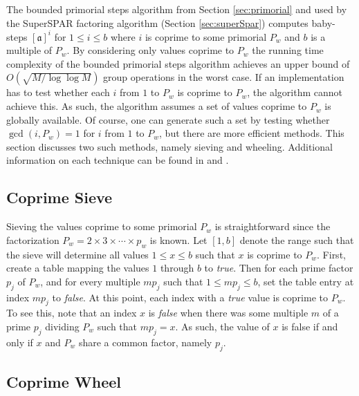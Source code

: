 \documentclass{ucalgthes1}
\theoremstyle{definition}
\newcommand{\ideal}{\mathfrak}
\newcommand{\idealclass}[1]{\left[ \ideal #1 \right]}
\newcommand{\aclass}{\idealclass a}
\begin{document}
The bounded primorial steps algorithm from Section \ref{sec:primorial} and used by the SuperSPAR factoring algorithm (Section \ref{sec:superSpar}) computes baby-steps $\aclass^i$ for $1 \le i \le b$ where $i$ is coprime to some primorial $P_w$ and $b$ is a multiple of $P_w$.  By considering only values coprime to $P_w$ the running time complexity of the bounded primorial steps algorithm achieves an upper bound of $O(\sqrt{M/\log \log M})$ group operations in the worst case.  If an implementation has to test whether each $i$ from $1$ to $P_w$ is coprime to $P_w$, the algorithm cannot achieve this.  As such, the algorithm assumes a set of values coprime to $P_w$ is globally available.  Of course, one can generate such a set by testing whether $\gcd(i, P_w) = 1$ for $i$ from $1$ to $P_w$, but there are more efficient methods.  This section discusses two such methods, namely sieving and wheeling.  Additional information on each technique can be found in \cite[pp.117--127]{Crandall2001} and \cite[p.494]{Sutherland2009}.


\subsection{Coprime Sieve}

Sieving the values coprime to some primorial $P_w$ is straightforward since the factorization $P_w = 2 \times 3 \times \cdots \times p_w$ is known.  Let $[1,b]$ denote the range such that the sieve will determine all values $1 \le x \le b$ such that $x$ is coprime to $P_w$.  First, create a table mapping the values $1$ through $b$ to \emph{true}.  Then for each prime factor $p_j$ of $P_w$, and for every multiple $mp_j$ such that $1 \le mp_j \le b$, set the table entry at index $mp_j$ to \emph{false}.  At this point, each index with a \emph{true} value is coprime to $P_w$.  To see this, note that an index $x$ is \emph{false} when there was some multiple $m$ of a prime $p_j$ dividing $P_w$ such that $mp_j = x$.  As such, the value of $x$ is false if and only if $x$ and $P_w$ share a common factor, namely $p_j$.

\subsection{Coprime Wheel}
\newcommand{\coprimeset}{\mathcal C}
\newcommand{\coprimelist}{\mathcal D}
\end{document}

